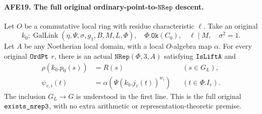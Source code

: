 \documentclass[11pt,a4paper]{article}
\numberwithin{equation}{section}
\theoremstyle{remark}\newtheorem{remark}[theorem]{Remark}
\begin{document}
\paragraph{AFE19. The full original ordinary-point-to-\(\texttt{NRep}\) descent.}
\label{claim:AFE19}
Let \(O\) be a commutative local ring with residue
characteristic \(\ell\).
Take an original
\[
 k_0:\operatorname{GalLink}(\eta,\Psi,\sigma,g_1,B,M,L,\Phi),
 \quad \Phi.\texttt{Ok}(C_0),\quad \ell\mid M,\quad\sigma^2=1.
 \]
Let \(A\) be any Noetherian local domain, with a local
\(O\)-algebra map \(\alpha\).
For every original \(\texttt{Ord\allowbreak Pt}\) \(r\), there is
an actual \(\texttt{NRep}(\Phi,3,A)\) satisfying
\(\texttt{Is\allowbreak Lift\allowbreak A}\) and
\[
 \begin{aligned}
 \rho(k_0.p_0(s))&=R(s) &&(s\in G_L),\\
 \psi_{v,i}(t)&=\alpha(\Psi(k_0.j_v(t))^{w_i})
                                      &&(t\in\Phi.I_v).
 \end{aligned}                                         \tag{AFE.29}
\]
The inclusion \(G_L\to G\) is understood in the first
line.  This is the full original
\(\texttt{exists\_\allowbreak nrep3}\), with no extra arithmetic
or representation-theoretic premise.
\end{document}
